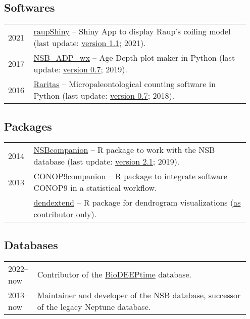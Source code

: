 \documentclass[11pt, a4paper]{article}
\begin{document}
\subsection{Softwares}
\begin{longtable}{@{}p{0.1\linewidth} P{0.85\linewidth}@{}}
2021 & \href{http://github.com/plannapus/raupShiny/releases}{raupShiny} -- Shiny App to display Raup's coiling model (last update: \href{https://doi.org/10.5281/zenodo.5171827}{version 1.1}; 2021).\\
2017 & \href{http://github.com/plannapus/NSB_ADP_wx/releases}{NSB\_ADP\_wx} -- Age-Depth plot maker in Python (last update: \href{http://doi.org/10.5281/zenodo.3408657}{version 0.7}; 2019).\\
2016 & \href{http://github.com/plannapus/Raritas/releases}{Raritas} -- Micropaleontological counting software in Python (last update: \href{https://github.com/plannapus/Raritas/releases/tag/v0.7}{version 0.7}; 2018).\\
\end{longtable}
\subsection{Packages}
\begin{longtable}{@{}p{0.1\linewidth} P{0.85\linewidth}@{}}
2014 & \href{http://github.com/plannapus/NSBcompanion}{NSBcompanion} -- R package to work with the NSB database (last update: \href{http://doi.org/10.5281/zenodo.3408198}{version 2.1}; 2019).\\
2013 & \href{http://github.com/plannapus/CONOP9companion}{CONOP9companion} -- R package to integrate software CONOP9 in a statistical workflow.\\
     & \href{https://cran.r-project.org/web/packages/dendextend/index.html}{dendextend} -- R package for dendrogram visualizations (\underline{as contributor only}).\\
\end{longtable}
\subsection{Databases}
\begin{longtable}{@{}p{0.1\linewidth} P{0.85\linewidth}@{}}
2022--now & Contributor of the \href{}{BioDEEPtime} database.\\
2013--now  & Maintainer and developer of the \href{http://nsb-mfn-berlin.de/}{NSB database}, successor of the legacy Neptune database.\\
\end{longtable}
\end{document}
